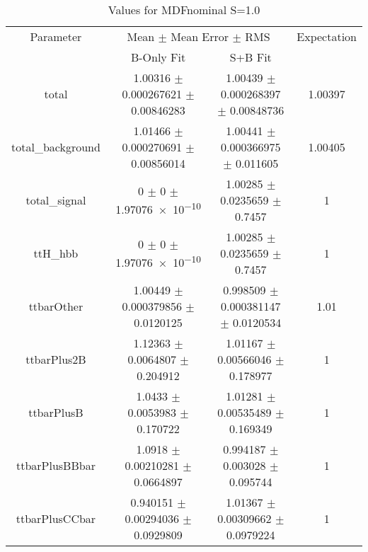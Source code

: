 \begin{table}
\centering
\caption{Values for MDFnominal S=1.0}
\begin{tabular}{cccc}
\toprule
Parameter & \multicolumn{2}{c}{Mean $\pm$ Mean Error $\pm$ RMS} & Expectation\\
 & B-Only Fit & S+B Fit & \\
\midrule
total & \num{1.00316} $\pm$ \num{0.000267621} $\pm$ \num{0.00846283} & \num{1.00439} $\pm$ \num{0.000268397} $\pm$ \num{0.00848736} & \num{1.00397}\\
total\_background & \num{1.01466} $\pm$ \num{0.000270691} $\pm$ \num{0.00856014} & \num{1.00441} $\pm$ \num{0.000366975} $\pm$ \num{0.011605} & \num{1.00405}\\
total\_signal & \num{0} $\pm$ \num{0} $\pm$ \num{1.97076e-10} & \num{1.00285} $\pm$ \num{0.0235659} $\pm$ \num{0.7457} & \num{1}\\
ttH\_hbb & \num{0} $\pm$ \num{0} $\pm$ \num{1.97076e-10} & \num{1.00285} $\pm$ \num{0.0235659} $\pm$ \num{0.7457} & \num{1}\\
ttbarOther & \num{1.00449} $\pm$ \num{0.000379856} $\pm$ \num{0.0120125} & \num{0.998509} $\pm$ \num{0.000381147} $\pm$ \num{0.0120534} & \num{1.01}\\
ttbarPlus2B & \num{1.12363} $\pm$ \num{0.0064807} $\pm$ \num{0.204912} & \num{1.01167} $\pm$ \num{0.00566046} $\pm$ \num{0.178977} & \num{1}\\
ttbarPlusB & \num{1.0433} $\pm$ \num{0.0053983} $\pm$ \num{0.170722} & \num{1.01281} $\pm$ \num{0.00535489} $\pm$ \num{0.169349} & \num{1}\\
ttbarPlusBBbar & \num{1.0918} $\pm$ \num{0.00210281} $\pm$ \num{0.0664897} & \num{0.994187} $\pm$ \num{0.003028} $\pm$ \num{0.095744} & \num{1}\\
ttbarPlusCCbar & \num{0.940151} $\pm$ \num{0.00294036} $\pm$ \num{0.0929809} & \num{1.01367} $\pm$ \num{0.00309662} $\pm$ \num{0.0979224} & \num{1}\\
\bottomrule
\end{tabular}
\end{table}